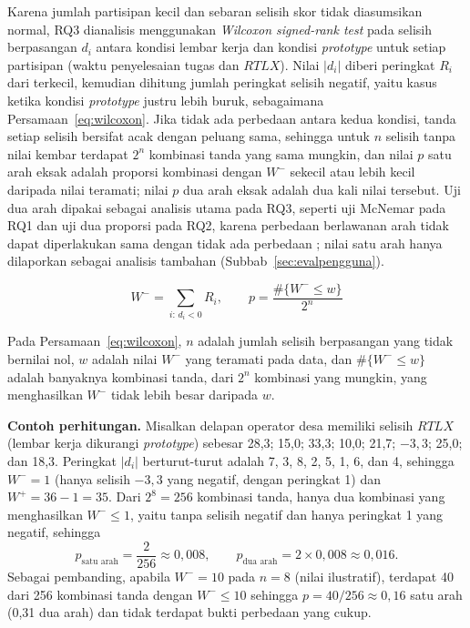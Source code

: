 Karena jumlah partisipan kecil dan sebaran selisih skor tidak diasumsikan normal, RQ3 dianalisis menggunakan \textit{Wilcoxon signed-rank test} \cite{rainio2024evaluation} pada selisih berpasangan $d_i$ antara kondisi lembar kerja dan kondisi \textit{prototype} untuk setiap partisipan (waktu penyelesaian tugas dan $RTLX$). Nilai $|d_i|$ diberi peringkat $R_i$ dari terkecil, kemudian dihitung jumlah peringkat selisih negatif, yaitu kasus ketika kondisi \textit{prototype} justru lebih buruk, sebagaimana Persamaan~\eqref{eq:wilcoxon}. Jika tidak ada perbedaan antara kedua kondisi, tanda setiap selisih bersifat acak dengan peluang sama, sehingga untuk $n$ selisih tanpa nilai kembar terdapat $2^n$ kombinasi tanda yang sama mungkin, dan nilai $p$ satu arah eksak adalah proporsi kombinasi dengan $W^{-}$ sekecil atau lebih kecil daripada nilai teramati; nilai $p$ dua arah eksak adalah dua kali nilai tersebut. Uji dua arah dipakai sebagai analisis utama pada RQ3, seperti uji McNemar pada RQ1 dan uji dua proporsi pada RQ2, karena perbedaan berlawanan arah tidak dapat diperlakukan sama dengan tidak ada perbedaan \cite{bland1994onetwosided}; nilai satu arah hanya dilaporkan sebagai analisis tambahan (Subbab~\ref{sec:evalpengguna}).

\begin{equation}
  W^{-} = \sum_{i:\, d_i < 0} R_i, \qquad p = \frac{\#\{W^{-} \leq w\}}{2^{n}}
  \label{eq:wilcoxon}
\end{equation}

\noindent Pada Persamaan~\eqref{eq:wilcoxon}, $n$ adalah jumlah selisih berpasangan yang tidak bernilai nol, $w$ adalah nilai $W^{-}$ yang teramati pada data, dan $\#\{W^{-} \leq w\}$ adalah banyaknya kombinasi tanda, dari $2^{n}$ kombinasi yang mungkin, yang menghasilkan $W^{-}$ tidak lebih besar daripada $w$.

\noindent\textbf{Contoh perhitungan.} Misalkan delapan operator desa memiliki selisih $RTLX$ (lembar kerja dikurangi \textit{prototype}) sebesar 28,3; 15,0; 33,3; 10,0; 21,7; $-3{,}3$; 25,0; dan 18,3. Peringkat $|d_i|$ berturut-turut adalah 7, 3, 8, 2, 5, 1, 6, dan 4, sehingga $W^{-} = 1$ (hanya selisih $-3{,}3$ yang negatif, dengan peringkat 1) dan $W^{+} = 36 - 1 = 35$. Dari $2^{8} = 256$ kombinasi tanda, hanya dua kombinasi yang menghasilkan $W^{-} \leq 1$, yaitu tanpa selisih negatif dan hanya peringkat 1 yang negatif, sehingga
\[
  p_{\text{satu arah}} = \frac{2}{256} \approx 0{,}008, \qquad p_{\text{dua arah}} = 2 \times 0{,}008 \approx 0{,}016.
\]
Sebagai pembanding, apabila $W^{-} = 10$ pada $n = 8$ (nilai ilustratif), terdapat 40 dari 256 kombinasi tanda dengan $W^{-} \leq 10$ sehingga $p = 40/256 \approx 0{,}16$ satu arah (0,31 dua arah) dan tidak terdapat bukti perbedaan yang cukup.

